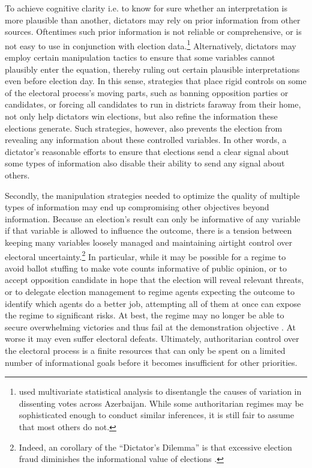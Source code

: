\documentclass[12pt]{article}
\newcommand{\1}{\mathbbm{1}}
\begin{document}
To achieve cognitive clarity i.e. to know for sure whether an interpretation is more plausible than another, dictators may rely on prior information from other sources. Oftentimes such prior information is not reliable or comprehensive, or is not easy to use in conjunction with election data.\footnote{\citet{Herron2011} used multivariate statistical analysis to disentangle the causes of variation in dissenting votes across Azerbaijan. While some authoritarian regimes may be sophisticated enough to conduct similar inferences, it is still fair to assume that most others do not.} Alternatively, dictators may employ certain manipulation tactics to ensure that some variables cannot plausibly enter the equation, thereby ruling out certain plausible interpretations even before election day. In this sense, strategies that place rigid controls on some of the electoral process's moving parts, such as banning opposition parties or candidates, or forcing all candidates to run in districts faraway from their home, not only help dictators win elections, but also refine the information these elections generate. Such strategies, however, also prevents the election from revealing any information about these controlled variables. In other words, a dictator's reasonable efforts to ensure that elections send a clear signal about some types of information also disable their ability to send any signal about others.

Secondly, the manipulation strategies needed to optimize the quality of multiple types of information may end up compromising other objectives beyond information. Because an election's result can only be informative of any variable if that variable is allowed to influence the outcome, there is a tension between keeping many variables loosely managed and maintaining airtight control over electoral uncertainty.\footnote{Indeed, an corollary of the ``Dictator's Dilemma'' is that excessive election fraud diminishes the informational value of elections \citep{Wintrobe2000}. } In particular, while it may be possible for a regime to avoid ballot stuffing to make vote counts informative of public opinion, or to accept opposition candidate in hope that the election will reveal relevant threats, or to delegate election management to regime agents expecting the outcome to identify which agents do a better job, attempting all of them at once can expose the regime to significant risks. At best, the regime may no longer be able to secure overwhelming victories and thus fail at the demonstration objective \citep{Geddes2005}. At worse it may even suffer electoral defeats. Ultimately, authoritarian control over the electoral process is a finite resources that can only be spent on a limited number of informational goals before it becomes insufficient for other priorities.
\end{document}
